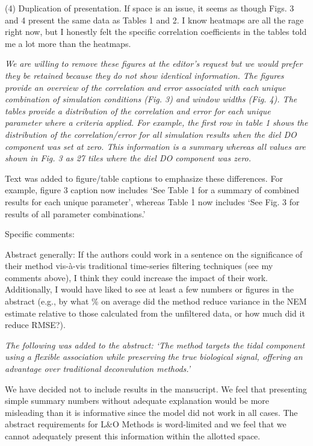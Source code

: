 \documentclass[letterpaper,12pt]{article}\usepackage[]{graphicx}\usepackage[]{color}
\begin{document}
(4) Duplication of presentation. If space is an issue, it seems as though Figs. 3 and 4 present the same data as Tables 1 and 2. I know heatmaps are all the rage right now, but I honestly felt the specific correlation coefficients in the tables told me a lot more than the heatmaps.

{\it We are willing to remove these figures at the editor's request but we would prefer they be retained because they do not show identical information.  The figures provide an overview of the correlation and error associated with each unique combination of simulation conditions (Fig. 3) and window widths (Fig. 4).  The tables provide a distribution of the correlation and error for each unique parameter where a criteria applied.  For example, the first row in table 1 shows the distribution of the correlation/error for all simulation results when the diel DO component was set at zero.  This information is a summary whereas all values are shown in Fig. 3 as 27 tiles where the diel DO component was zero.

Text was added to figure/table captions to emphasize these differences.  For example, figure 3 caption now includes `See Table 1 for a summary of combined results for each unique parameter', whereas Table 1 now includes `See Fig. 3 for results of all parameter combinations.'
}

Specific comments:

Abstract generally: If the authors could work in a sentence on the significance of their method vis-à-vis traditional time-series filtering techniques (see my comments above), I think they could increase the impact of their work. Additionally, I would have liked to see at least a few numbers or figures in the abstract (e.g., by what \% on average did the method reduce variance in the NEM estimate relative to those calculated from the unfiltered data, or how much did it reduce RMSE?).

{\it The following was added to the abstract: `The method targets the tidal component using a flexible association while preserving the true biological signal, offering an advantage over traditional deconvulution methods.'

We have decided not to include results in the mansucript.  We feel that presenting simple summary numbers without adequate explanation would be more misleading than it is informative since the model did not work in all cases.  The abstract requirements for L\&O Methods is word-limited and we feel that we cannot adequately present this information within the allotted space.
}
\end{document}

